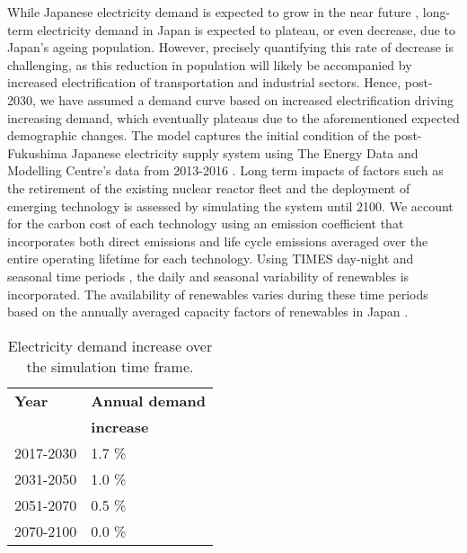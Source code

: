 While Japanese electricity demand is expected to grow in the near future  \cite{noauthor_electricity_2019}, long-term electricity demand in Japan is expected to plateau, or even decrease, due to Japan's ageing population. However, precisely quantifying this rate of decrease is challenging, as this reduction in population will likely be accompanied by increased electrification of transportation and industrial sectors. Hence, post-2030, we have assumed a demand curve based on increased electrification driving increasing demand, which eventually plateaus due to the aforementioned expected demographic changes. The model captures the initial condition of the post-Fukushima Japanese electricity supply system using The Energy Data and Modelling Centre's data from 2013-2016 \cite{the_institute_of_energy_economics_japan_energy_2018}. Long term impacts of factors such as the retirement of the existing nuclear reactor fleet and the deployment of emerging technology is assessed by simulating the system until 2100. We account for the carbon cost of each technology using an emission coefficient that incorporates both direct emissions and life cycle emissions averaged over the entire operating lifetime for each technology. Using \gls{TIMES} day-night and seasonal time periods \cite{loulou_etsap-tiam_2008}, the daily and seasonal variability of renewables is incorporated. The availability of renewables varies during these time periods based on the annually averaged capacity factors of renewables in Japan \cite{the_institute_of_energy_economics_japan_energy_2018, irena_renewable_2020}.

\begin{table}[!ht]
	\caption{Electricity demand increase over the simulation time frame.}
	\vspace{0.1in}
	\begin{tabularx}{0.4\textwidth}{p{} p{}}
		\hline
\textbf{Year} & \textbf{Annual demand} \\
 & \textbf{increase} \\
\hline
2017-2030 & 1.7 \% \cite{noauthor_electricity_2019} \\
2031-2050 & 1.0 \% \\
2051-2070 & 0.5 \% \\
2070-2100 & 0.0 \% \\
\hline 
	\end{tabularx}
\label{demand}
\end{table}

